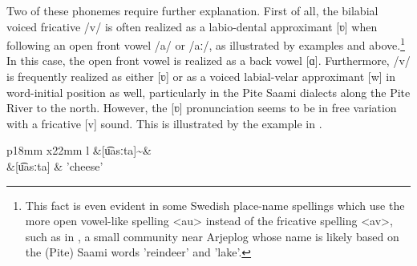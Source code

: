 Two of these phonemes require further explanation. First of all, the bilabial voiced fricative /v/ is often realized as a labio-dental approximant [ʋ] when following an open front vowel /a/ or /aː/, as illustrated by examples  and  above.\footnote{This fact is even evident in some Swedish place-name spellings which use the more open vowel-like spelling <au> instead of the fricative spelling <av>, such as in , a small community near Arjeplog whose name is likely based on the (Pite) Saami words  'reindeer' and  'lake’.} %
In this case, the open front vowel is realized as a back vowel [ɑ]. 
Furthermore, /v/ is frequently realized as either [ʋ] or as a voiced labial-velar approximant [w] in word-initial position as well, particularly in the Pite Saami dialects along the Pite River to the north. However, the [ʋ] pronunciation seems to be in free variation with a fricative [v] sound. 
This is illustrated by the example in .%
\ea\label{cheeseNOMSG}
\begin{tabular}{p{18mm} x{22mm} l }%
 &[u͡asːta]\textasciitilde & 		\\%
					 &[u͡asːta] 			& 'cheese\BS{}'	\\%
\end{tabular}
\hfill{}
\z

